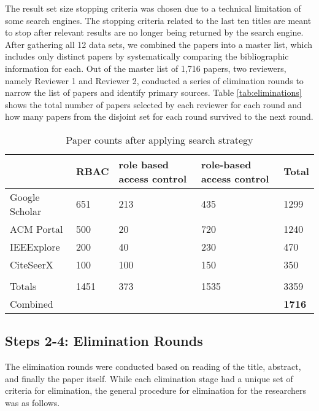 The result set size stopping criteria was chosen due to a technical limitation of some search engines.  The stopping criteria related to the last ten titles are meant to stop after relevant results are no longer being returned by the search engine.  After gathering all 12 data sets, we combined the papers into a master list, which includes only distinct papers by systematically comparing the bibliographic information for each.
Out of the master list of 1,716 papers, two reviewers, namely Reviewer 1 and Reviewer 2, conducted a series of elimination rounds to narrow the list of papers and identify primary sources. Table \ref{tab:eliminations} shows the total number of papers selected by each reviewer for each round and how many papers from the disjoint set for each round survived to the next round.

\begin{table}
\centering
\caption{Paper counts after applying search strategy}
\begin{tabular}{|p{3.5cm}|p{1.25cm}|p{4.25cm}|p{4.25cm}|p{1cm}|}

\hline
 & 
\textbf{RBAC} & 
\textbf{role based access control} & 
\textbf{role-based access control} & 
\textbf{Total}
\\\hline

Google Scholar & 651 & 213 & 435 & 1299 \\\hline
ACM Portal & 500 & 20 & 720 & 1240 \\\hline
IEEExplore & 200 & 40 & 230 & 470 \\\hline
CiteSeerX & 100 & 100 & 150 & 350 \\\hline
 &  &  &  & \\\hline
Totals & 1451 & 373 & 1535 & 3359 \\\hline
Combined &  &  &  & \textbf{1716} \\\hline

\end{tabular}
\label{tab:search_results}
\end{table}

\subsection{Steps 2-4: Elimination Rounds}

The elimination rounds were conducted based on reading of the title, abstract, and finally the paper itself.  While each elimination stage had a unique set of criteria for elimination, the general procedure for elimination for the researchers was as follows.

